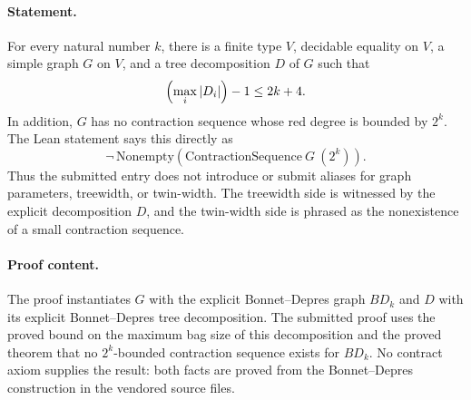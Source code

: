 \paragraph{Statement.}
For every natural number \(k\), there is a finite type \(V\), decidable equality
on \(V\), a simple graph \(G\) on \(V\), and a tree decomposition \(D\) of \(G\)
such that
\[
  \Bigl(\max_i |D_i|\Bigr)-1 \le 2k+4 .
\]
In addition, \(G\) has no contraction sequence whose red degree is bounded by
\(2^k\).  The Lean statement says this directly as
\[
  \neg\,\mathrm{Nonempty}
    (\mathrm{ContractionSequence}\ G\ (2^k)).
\]
Thus the submitted entry does not introduce or submit aliases for graph
parameters, treewidth, or twin-width.  The treewidth side is witnessed by the
explicit decomposition \(D\), and the twin-width side is phrased as the
nonexistence of a small contraction sequence.

\paragraph{Proof content.}
The proof instantiates \(G\) with the explicit Bonnet--Depres graph
\(BD_k\) and \(D\) with its explicit Bonnet--Depres tree decomposition.  The
submitted proof uses the proved bound on the maximum bag size of this
decomposition and the proved theorem that no \(2^k\)-bounded contraction
sequence exists for \(BD_k\).  No contract axiom supplies the result: both
facts are proved from the Bonnet--Depres construction in the vendored source
files.
